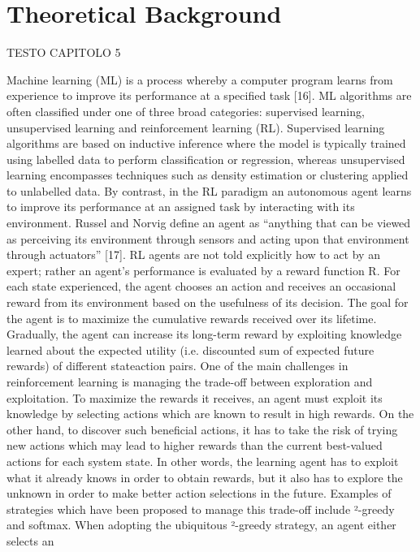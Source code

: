 \chapter{Theoretical Background}
\label{Theoretical Background}
\thispagestyle{empty}

TESTO CAPITOLO 5

Machine learning (ML) is a process whereby a computer
program learns from experience to improve its performance at
a specified task [16]. ML algorithms are often classified under
one of three broad categories: supervised learning, unsupervised learning and reinforcement learning (RL). Supervised
learning algorithms are based on inductive inference where
the model is typically trained using labelled data to perform
classification or regression, whereas unsupervised learning encompasses techniques such as density estimation or clustering
applied to unlabelled data. By contrast, in the RL paradigm
an autonomous agent learns to improve its performance at
an assigned task by interacting with its environment. Russel
and Norvig define an agent as “anything that can be viewed
as perceiving its environment through sensors and acting
upon that environment through actuators” [17]. RL agents
are not told explicitly how to act by an expert; rather an
agent’s performance is evaluated by a reward function R.
For each state experienced, the agent chooses an action and
receives an occasional reward from its environment based on
the usefulness of its decision. The goal for the agent is to
maximize the cumulative rewards received over its lifetime.
Gradually, the agent can increase its long-term reward by
exploiting knowledge learned about the expected utility (i.e.
discounted sum of expected future rewards) of different stateaction pairs. One of the main challenges in reinforcement
learning is managing the trade-off between exploration and
exploitation. To maximize the rewards it receives, an agent
must exploit its knowledge by selecting actions which are
known to result in high rewards. On the other hand, to
discover such beneficial actions, it has to take the risk of
trying new actions which may lead to higher rewards than
the current best-valued actions for each system state. In other
words, the learning agent has to exploit what it already knows
in order to obtain rewards, but it also has to explore the
unknown in order to make better action selections in the future.
Examples of strategies which have been proposed to manage
this trade-off include ²-greedy and softmax. When adopting
the ubiquitous ²-greedy strategy, an agent either selects an
